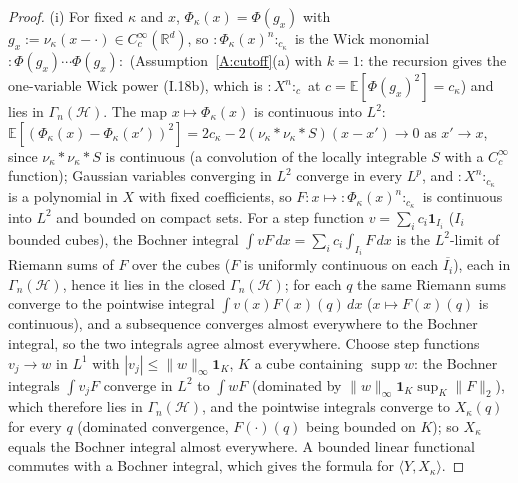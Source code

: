 \documentclass[11pt,a4paper]{article}
\theoremstyle{plain}
\theoremstyle{definition}
\theoremstyle{plain}
\theoremstyle{definition}
\newcommand{\R}{\mathbb{R}}
\newcommand{\E}{\mathbb{E}}
\newcommand{\HH}{\mathcal{H}}
\newcommand{\ip}[2]{\langle #1,#2\rangle}
\DeclareMathOperator{\supp}{supp}
\begin{document}
\begin{proof}
(i) For fixed $\kappa$ and $x$, $\Phi_\kappa(x)=\Phi(g_x)$ with $g_x:=\nu_\kappa(x-\cdot)\in
C_c^\infty(\R^d)$, so ${:}\Phi_\kappa(x)^n{:}_{c_\kappa}$ is the Wick monomial
${:}\Phi(g_x)\cdots\Phi(g_x){:}$ (Assumption~\ref{A:cutoff}(a) with $k=1$: the recursion gives the
one-variable Wick power (I.18b), which is ${:}X^n{:}_c$ at $c=\E[\Phi(g_x)^2]=c_\kappa$) and
lies in $\Gamma_n(\HH)$.  The map $x\mapsto\Phi_\kappa(x)$ is continuous into $L^2$:
$\E[(\Phi_\kappa(x)-\Phi_\kappa(x'))^2]=2c_\kappa-2(\nu_\kappa*\nu_\kappa*S)(x-x')\to0$ as
$x'\to x$, since $\nu_\kappa*\nu_\kappa*S$ is continuous (a convolution of the locally
integrable $S$ with a $C_c^\infty$ function); Gaussian variables converging in $L^2$ converge
in every $L^p$, and ${:}X^n{:}_{c_\kappa}$ is a polynomial in $X$ with fixed coefficients, so
$F:x\mapsto{:}\Phi_\kappa(x)^n{:}_{c_\kappa}$ is continuous into $L^2$ and bounded on compact
sets.  For a step function $v=\sum_ic_i\mathbf 1_{I_i}$ ($I_i$ bounded cubes), the Bochner
integral $\int vF\,dx=\sum_ic_i\int_{I_i}F\,dx$ is the $L^2$-limit of Riemann sums of $F$
over the cubes ($F$ is uniformly continuous on each $\overline{I_i}$), each in $\Gamma_n(\HH)$,
hence it lies in the closed $\Gamma_n(\HH)$; for each $q$ the same Riemann sums converge to
the pointwise integral $\int v(x)F(x)(q)\,dx$ ($x\mapsto F(x)(q)$ is continuous), and a
subsequence converges almost everywhere to the Bochner integral, so the two integrals agree
almost everywhere.  Choose step functions $v_j\to w$ in $L^1$ with $|v_j|\le\|w\|_\infty\mathbf
1_K$, $K$ a cube containing $\supp w$: the Bochner integrals $\int v_jF$ converge in $L^2$ to
$\int wF$ (dominated by $\|w\|_\infty\mathbf 1_K\sup_K\|F\|_2$), which therefore lies in
$\Gamma_n(\HH)$, and the pointwise integrals converge to $X_\kappa(q)$ for every $q$ (dominated
convergence, $F(\cdot)(q)$ being bounded on $K$); so $X_\kappa$ equals the Bochner integral
almost everywhere.  A bounded linear functional commutes with a Bochner integral, which gives
the formula for $\ip Y{X_\kappa}$.


\end{proof}
\end{document}
